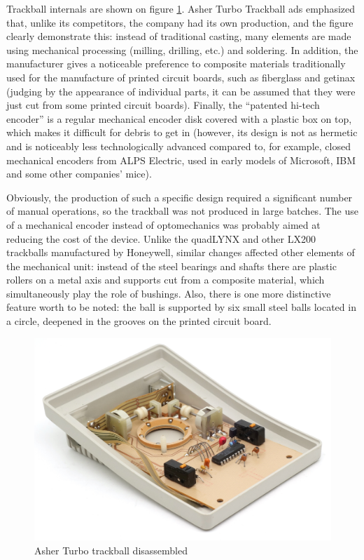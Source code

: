 \documentclass[11pt, a4paper]{article}
\begin{document}
Trackball internals are shown on figure \ref{fig:AsherInside}. Asher Turbo Trackball ads emphasized that, unlike its competitors, the company had its own production, and the figure clearly demonstrate this: instead of traditional casting, many elements are made using mechanical processing (milling, drilling, etc.) and soldering. In addition, the manufacturer gives a noticeable preference to composite materials traditionally used for the manufacture of printed circuit boards, such as fiberglass and getinax (judging by the appearance of individual parts, it can be assumed that they were just cut from some printed circuit boards). Finally, the ``patented hi-tech encoder'' is a regular mechanical encoder disk covered with a plastic box on top, which makes it difficult for debris to get in (however, its design is not as hermetic and is noticeably less technologically advanced compared to, for example, closed mechanical encoders from ALPS Electric, used in early models of Microsoft, IBM and some other companies' mice).

Obviously, the production of such a specific design required a significant number of manual operations, so the trackball was not produced in large batches.
The use of a mechanical encoder instead of optomechanics was probably aimed at reducing the cost of the device. Unlike the quadLYNX and other LX200 trackballs manufactured by Honeywell, similar changes affected other elements of the mechanical unit: instead of the steel bearings and shafts there are plastic rollers on a metal axis and supports cut from a composite material, which simultaneously play the role of bushings. Also, there is one more distinctive feature worth to be noted: the ball is supported by six small steel balls located in a circle, deepened in the grooves on the printed circuit board.

\begin{figure}[h]
    \centering
    \includegraphics[scale=0.7]{1988_asher_turbo_trackball/inside_60.jpg}
    \caption{Asher Turbo trackball disassembled}
    \label{fig:AsherInside}
\end{figure}
\end{document}
